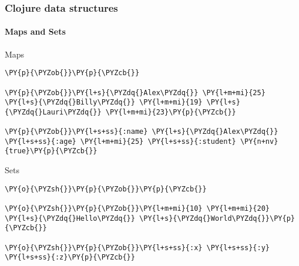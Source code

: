 \begin{frame}[fragile]
  \frametitle{Clojure data structures}
  \framesubtitle{Maps and Sets}

  \begin{block}{Maps}
\begin{Verbatim}[commandchars=\\\{\}]
\PY{p}{\PYZob{}}\PY{p}{\PYZcb{}}

\PY{p}{\PYZob{}}\PY{l+s}{\PYZdq{}Alex\PYZdq{}} \PY{l+m+mi}{25} \PY{l+s}{\PYZdq{}Billy\PYZdq{}} \PY{l+m+mi}{19} \PY{l+s}{\PYZdq{}Lauri\PYZdq{}} \PY{l+m+mi}{23}\PY{p}{\PYZcb{}}

\PY{p}{\PYZob{}}\PY{l+s+ss}{:name} \PY{l+s}{\PYZdq{}Alex\PYZdq{}} \PY{l+s+ss}{:age} \PY{l+m+mi}{25} \PY{l+s+ss}{:student} \PY{n+nv}{true}\PY{p}{\PYZcb{}}
\end{Verbatim}
  \end{block}

  \begin{block}{Sets}
\begin{Verbatim}[commandchars=\\\{\}]
\PY{o}{\PYZsh{}}\PY{p}{\PYZob{}}\PY{p}{\PYZcb{}}

\PY{o}{\PYZsh{}}\PY{p}{\PYZob{}}\PY{l+m+mi}{10} \PY{l+m+mi}{20} \PY{l+s}{\PYZdq{}Hello\PYZdq{}} \PY{l+s}{\PYZdq{}World\PYZdq{}}\PY{p}{\PYZcb{}}

\PY{o}{\PYZsh{}}\PY{p}{\PYZob{}}\PY{l+s+ss}{:x} \PY{l+s+ss}{:y} \PY{l+s+ss}{:z}\PY{p}{\PYZcb{}}
\end{Verbatim}
  \end{block}
\end{frame}


